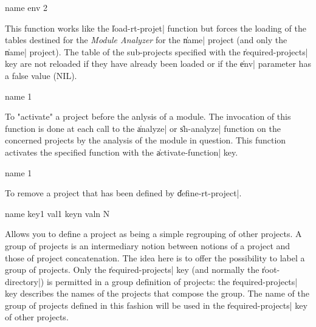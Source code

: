  {name env} {2}

This function works like the \|load-rt-projet| function but forces the loading of the tables destined for the {\em Module Analyzer} for the \|name| project (and only the \|name| project).  The table of the sub-projects specified with the \|required-projects| key are not reloaded if they have already been loaded or if the \|env| parameter has a false value (NIL).

 {name} {1}

To "activate" a project before the anlysis of a module.  The invocation of this function is done at each call to the \|analyze| or \|sh-analyze| function on the concerned projects by the analysis of the module in question.  This function activates the specified function with the \|activate-function| key.

 {name} {1}

To remove a project that has been defined by \|define-rt-project|.

 {name key1 val1 keyn valn} {N}

Allows you to define a project as being a simple regrouping of other projects.  A group of projects is an intermediary notion between notions of a project and those of project concatenation.  The idea here is to offer the possibility to label a group of projects.
Only the \|required-projects| key (and normally the \|root-directory|) 
is permitted in a group definition of projects:  the \|required-projects| key describes the names of the projects that compose the group.
The name of the group of projects defined in this fashion will be used in the \|required-projects| key of other projects.

%

